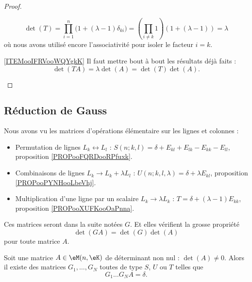 \begin{proof}
\begin{subproof}
            \begin{equation}
                \det(T)=\prod_{i=1}^n\big( 1+(\lambda-1)\delta_{ki} \big)=\left( \prod_{i\neq k}1 \right)(1+(\lambda-1))=\lambda
            \end{equation}
            où nous avons utilisé encore l'associativité pour isoler le facteur \( i=k\).
        \item[\ref{ITEMooIFRVooWQYgkK}]
            Il faut mettre bout à bout les résultats déjà faits :
            \begin{equation}
                \det(TA)=\lambda\det(A)=\det(T)\det(A).
            \end{equation}
    \end{subproof}
\end{proof}

\subsection{Réduction de Gauss}

Nous avons vu les matrices d'opérations élémentaire sur les lignes et colonnes :
\begin{itemize}
    \item Permutation de lignes \( L_k\leftrightarrow L_l\)  : \( S(n;k,l)=\delta+E_{kl}+E_{lk}-E_{kk}-E_{ll}\), proposition \ref{PROPooFQRDooRPfuxk}.
    \item Combinaisons de lignes \( L_k\to L_k+\lambda L_l\) : \( U(n;k,l,\lambda)=\delta+\lambda E_{kl}\), proposition \ref{PROPooPYNHooLbeVhj}.
    \item Multiplication d'une ligne par un scalaire \( L_k\to \lambda L_k\) : \( T=\delta+(\lambda-1)E_{kk}\), proposition \ref{PROPooXUFKooOaPnna}.
\end{itemize}

Ces matrices seront dans la suite notées \( G\). Et elles vérifient la grosse propriété
\begin{equation}        \label{EQooLQTVooBYjVYl}
    \det(GA)=\det(G)\det(A)
\end{equation}
pour toute matrice \( A\).

\begin{proposition}        \label{PROPooJBTZooNLobpf}
    Soit une matrice \( A\in \eM(n,\eK)\) de déterminant non nul : \( \det(A)\neq 0\). Alors il existe des matrices \( G_1,\ldots, G_N\) toutes de type \( S\), \( U\) ou \( T\) telles que
    \begin{equation}
        G_1\ldots G_NA=\delta.
    \end{equation}
\end{proposition}

